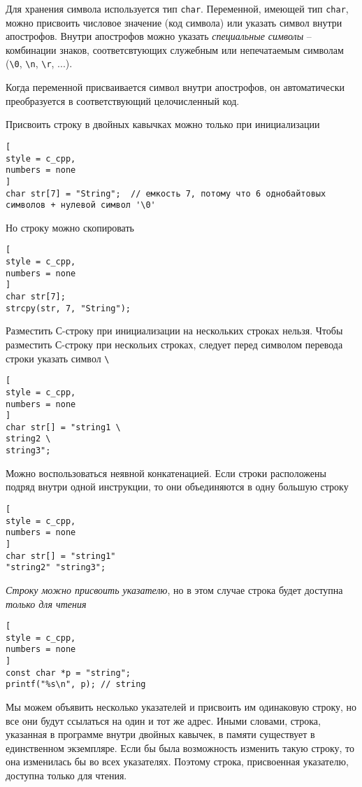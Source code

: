 \documentclass[%
	11pt,
	a4paper,
	utf8,
		]{article}
\begin{document}
Для хранения символа используется тип \verb*|char|. Переменной, имеющей тип \verb|char|, можно присвоить числовое значение (код символа) или указать символ внутри апострофов. Внутри апострофов можно указать \emph{специальные символы} -- комбинации знаков, соответсвтующих служебным или непечатаемым символам (\verb*|\0|, \verb|\n|, \verb|\r|, ...).

Когда переменной присваивается символ внутри апострофов, он автоматически преобразуется в соответствующий целочисленный код.

Присвоить строку в двойных кавычках можно только при инициализации
\begin{lstlisting}[
style = c_cpp,
numbers = none
]
char str[7] = "String";  // емкость 7, потому что 6 однобайтовых символов + нулевой символ '\0'
\end{lstlisting}

Но строку можно скопировать
\begin{lstlisting}[
style = c_cpp,
numbers = none
]
char str[7];
strcpy(str, 7, "String");
\end{lstlisting}

Разместить С-строку при инициализации на нескольких строках нельзя. Чтобы разместить С-строку при нескольих строках, следует перед символом перевода строки указать символ \verb|\|
\begin{lstlisting}[
style = c_cpp,
numbers = none
]
char str[] = "string1 \
string2 \
string3";
\end{lstlisting}

Можно воспользоваться неявной конкатенацией. Если строки расположены подряд внутри одной инструкции, то они объединяются в одну большую строку
\begin{lstlisting}[
style = c_cpp,
numbers = none	
]
char str[] = "string1"
"string2" "string3";
\end{lstlisting}

\emph{Строку можно присвоить указателю}, но в этом случае строка будет доступна \emph{только для чтения} \cite[]{prokhorenok-prog-c:2020}
\begin{lstlisting}[
style = c_cpp,
numbers = none	
]
const char *p = "string";
printf("%s\n", p); // string
\end{lstlisting}

Мы можем объявить несколько указателей и присвоить им одинаковую строку, но все они будут ссылаться на один и тот же адрес. Иными словами, строка, указанная в программе внутри двойных кавычек, в памяти существует в единственном экземпляре. Если бы была возможность изменить такую строку, то она изменилась бы во всех указателях. Поэтому строка, присвоенная указателю, доступна только для чтения.
\end{document}
